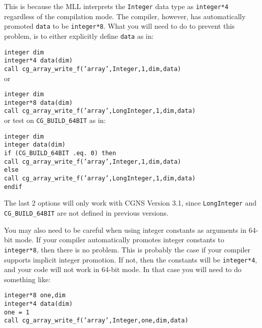 This is because the MLL interprets the \texttt{Integer} data type
as \texttt{integer*4} regardless of the compilation mode. The compiler,
however, has automatically promoted \texttt{data} to be
\texttt{integer*8}. What you will need to do to prevent this problem,
is to either explicitly define \texttt{data} as in:

\noindent \texttt{integer dim} \\
\noindent \texttt{integer*4 data(dim)} \\
\noindent \texttt{call cg\_array\_write\_f('array',Integer,1,dim,data)} \\

\noindent or

\noindent \texttt{integer dim} \\
\noindent \texttt{integer*8 data(dim)} \\
\noindent \texttt{call cg\_array\_write\_f('array',LongInteger,1,dim,data)} \\

\noindent or test on \texttt{CG\_BUILD\_64BIT} as in:

\noindent \texttt{integer dim} \\
\noindent \texttt{integer data(dim)} \\
\noindent \texttt{if (CG\_BUILD\_64BIT .eq. 0) then} \\
\indent  \texttt{call cg\_array\_write\_f('array',Integer,1,dim,data)} \\
\noindent \texttt{else} \\
\indent  \texttt{call cg\_array\_write\_f('array',LongInteger,1,dim,data)} \\
\noindent \texttt{endif}

The last 2 options will only work with CGNS Version 3.1, since
\texttt{LongInteger} and \texttt{CG\_BUILD\_64BIT} are
not defined in previous versions.

You may also need to be careful when using integer constants as arguments
in 64-bit mode. If your compiler automatically promotes integer constants
to \texttt{integer*8}, then there is no problem. This is probably
the case if your compiler supports implicit integer promotion. If not,
then the constants will be \texttt{integer*4}, and your code
will not work in 64-bit mode. In that case you will need to do something like:

\noindent \texttt{integer*8 one,dim} \\
\noindent \texttt{integer*4 data(dim)} \\
\noindent \texttt{one = 1} \\
\noindent \texttt{call cg\_array\_write\_f('array',Integer,one,dim,data)}

